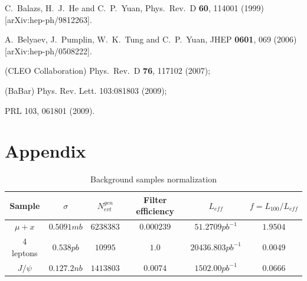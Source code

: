 \documentclass[aps,prl,twocolumn,nofootinbib,superscriptaddress]{revtex4}
\begin{document}
\begin{thebibliography}{99}
  C.~Balazs, H.~J.~He and C.~P.~Yuan,
  Phys.\ Rev.\  D {\bf 60}, 114001 (1999)
  [arXiv:hep-ph/9812263].
  
  
  A.~Belyaev, J.~Pumplin, W.~K.~Tung and C.~P.~Yuan,
  JHEP {\bf 0601}, 069 (2006)
  [arXiv:hep-ph/0508222].

 (CLEO Collaboration) Phys.\ Rev.\ D {\bf 76}, 117102 (2007); 

 (BaBar) Phys. Rev. Lett. 103:081803 (2009);

 PRL 103, 061801 (2009).
  
%
%

    
\end{thebibliography}

\section{Appendix}


\begin{table}[t]
\caption{Background samples normalization\label{bckgr_normalize}}
\begin{center}
\begin{tabular}{|c|c|c|c|c|c|}
\hline
Sample & $\sigma$ & $N^{gen}_{evt}$ & Filter efficiency & $L_{eff}$ & $f = L_{100}/L_{eff}$ \\ \hline
$\mu+x$ &           $0.5091mb$    &    $6238383$      &    $0.000239$  &  $51.2709pb^{-1}$   &  $1.9504$ \\ \hline
4 leptons &        $0.538pb$     &    $10995$        &    $1.0$       &  $20436.803pb^{-1}$ &  $0.0049$ \\ \hline
$J/\psi$ &         $0.127.2nb$   &    $1413803$      &    $0.0074$    &  $1502.00pb^{-1}$   &  $0.0666$ \\ \hline

\end{tabular}
\end{center}
\end{table}
\end{document}
